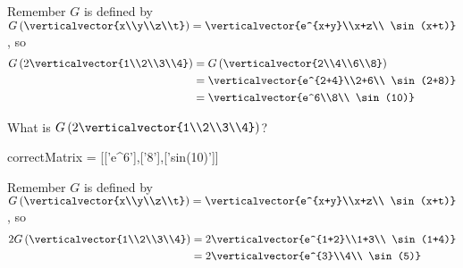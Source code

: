 \documentclass{ximera}
\begin{document}
\begin{question}
\begin{solution}
\begin{hint}
\begin{question}
        	\begin{solution}
		\begin{hint}
			Remember $G$ is defined by $G\left( \verticalvector{x\\y\\z\\t}\right) =\verticalvector{e^{x+y}\\x+z\\ \sin(x+t)}$, so
			\begin{align*}
				G\left( 2\verticalvector{1\\2\\3\\4} \right) &= G\left( \verticalvector{2\\4\\6\\8}\right)\\
					&=\verticalvector{e^{2+4}\\2+6\\ \sin(2+8)}\\
					&=\verticalvector{e^6\\8\\ \sin(10)}
			\end{align*}
		\end{hint}
        	 What is $G\left( 2\verticalvector{1\\2\\3\\4}\right)$?
        	 \begin{matrix-answer}[name=v]
    			  correctMatrix = [['e^6'],['8'],['sin(10)']]
        	 \end{matrix-answer}
        	\end{solution}
        	\begin{solution}
		\begin{hint}
				Remember $G$ is defined by $G\left( \verticalvector{x\\y\\z\\t}\right) =\verticalvector{e^{x+y}\\x+z\\ \sin(x+t)}$, so
			\begin{align*}
				2G\left( \verticalvector{1\\2\\3\\4} \right) &= 2\verticalvector{e^{1+2}\\1+3\\ \sin(1+4)}\\
					&=2\verticalvector{e^{3}\\4\\ \sin(5)}\\

\end{align*}
\end{hint}
\end{solution}
\end{question}
\end{hint}
\end{solution}
\end{question}
\end{document}
